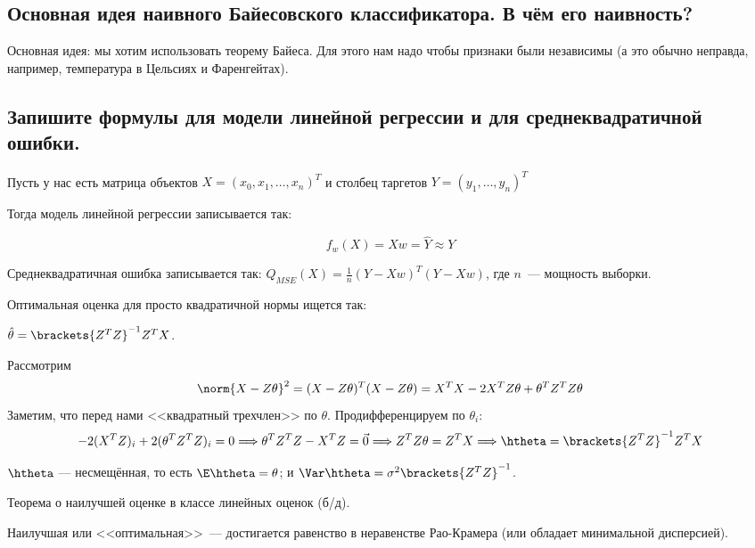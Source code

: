 \subsection{Основная идея наивного Байесовского классификатора. В чём его наивность?}

Основная идея: мы хотим использовать теорему Байеса. Для этого нам надо чтобы признаки были независимы (а это обычно неправда, например, температура в Цельсиях и Фаренгейтах).





\subsection{Запишите формулы для модели линейной регрессии и для среднеквадратичной ошибки.}

Пусть у нас есть матрица объектов $X = (x_0, x_1, \ldots, x_n)^T$ и столбец таргетов $Y = (y_1, \ldots, y_n)^T$

Тогда модель линейной регрессии записывается так:

$$f_w(X) = Xw = \hat{Y} \approx Y$$

Среднеквадратичная ошибка записывается так: $Q_{MSE}(X) = \frac{1}{n}(Y - Xw)^T (Y-Xw)$, где $n$~--- мощность выборки. 

Оптимальная оценка для просто квадратичной нормы ищется так: 

\Lemma $\hat{\theta} = \brackets{Z^T Z}^{-1} Z^T X$.

\Proof Рассмотрим
\begin{equation*} \label{lreg_1}
    \norm{X - Z\theta}^2 = (X - Z\theta)^T(X - Z\theta) = X^TX - 2X^TZ\theta + \theta^TZ^TZ\theta
\end{equation*}
Заметим, что перед нами <<квадратный трехчлен>> по $\theta$. Продифференцируем по $\theta_i$:
\begin{equation*}
    -2(X^TZ)_i + 2(\theta^TZ^TZ)_i = 0 \Longrightarrow \theta^TZ^TZ - X^TZ = \vec{0} \Longrightarrow Z^TZ\theta = Z^TX \Longrightarrow \htheta = \brackets{Z^T Z}^{-1} Z^T X
\end{equation*}
\Endproof

\Statement $\htheta$ — несмещённая, то есть $\E\htheta = \theta$; и $\Var\htheta = \sigma^2\brackets{Z^T Z}^{-1}$.

\Th Теорема о наилучшей оценке в классе линейных оценок (б/д).

\Note Наилучшая или <<оптимальная>>~--- достигается равенство в неравенстве Рао-Крамера (или обладает минимальной дисперсией).

